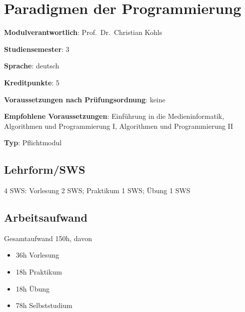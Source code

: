 \chapter{Paradigmen der
Programmierung\label{/mi-2017/modulbeschreibungen-bachelor/BA_Paradigmen-der-Programmierung}}\label{paradigmen-der-programmierungpathlabelmi-2017modulbeschreibungen-bachelorbaux5fparadigmen-der-programmierung}

\begin{modulHead}
\textbf{Modulverantwortlich}: Prof.~Dr.~Christian
Kohls
\end{modulHead}
\begin{modulHead}
\textbf{Studiensemester}:
3
\end{modulHead}
\begin{modulHead}
\textbf{Sprache}:
deutsch
\end{modulHead}
\begin{modulHead}
\textbf{Kreditpunkte}:
5
\end{modulHead}
\begin{modulHead}
\textbf{Voraussetzungen nach
Prüfungsordnung}:
keine
\end{modulHead}
\begin{modulHead}
\textbf{Empfohlene
Voraussetzungen}: Einführung in die Medieninformatik, Algorithmen und
Programmierung I, Algorithmen und Programmierung
II
\end{modulHead}
\begin{modulHead}
\textbf{Typ}:
Pflichtmodul
\end{modulHead}


\section*{Lehrform/SWS\label{/mi-2017/modulbeschreibungen-bachelor/BA_Paradigmen-der-Programmierung}}\label{lehrformswspathlabelmi-2017modulbeschreibungen-bachelorbaux5fparadigmen-der-programmierung}

4 SWS: Vorlesung 2 SWS; Praktikum 1 SWS; Übung 1 SWS

\section*{Arbeitsaufwand\label{/mi-2017/modulbeschreibungen-bachelor/BA_Paradigmen-der-Programmierung}}\label{arbeitsaufwandpathlabelmi-2017modulbeschreibungen-bachelorbaux5fparadigmen-der-programmierung}

Gesamtaufwand 150h, davon

\begin{itemize}
\tightlist
\item
  36h Vorlesung
\item
  18h Praktikum
\item
  18h Übung
\item
  78h Selbststudium
\end{itemize}

